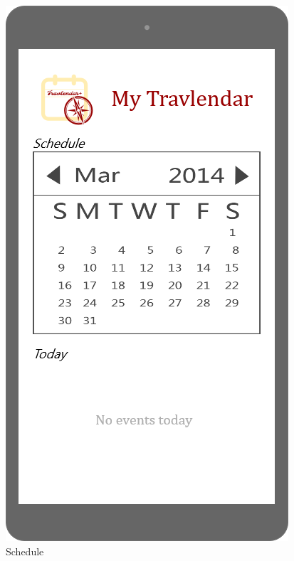 \documentclass{article}
\begin{document}
\begin{figure}[H]
  \includegraphics[width=\linewidth]{04-Schedule.png}
  \caption{Schedule}\label{fig:MU7}
\endminipage\hfill
{}

\end{figure}
\end{document}
